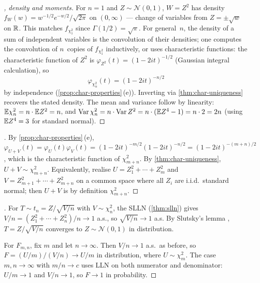 \begin{proof}[, density and moments]
For $n = 1$ and $Z \sim \mathcal{N}(0, 1)$, $W = Z^2$ has density
$f_W(w) = w^{-1/2} e^{-w/2}/\sqrt{2 \pi}$ on $(0, \infty)$ — change
of variables from $Z = \pm \sqrt w$ on $\mathbb{R}$. This matches
$f_{\chi^2_1}$ since $\Gamma(1/2) = \sqrt \pi$. For general~$n$, the
density of a sum of independent variables is the convolution of
their densities; one computes the convolution of $n$~copies of
$f_{\chi^2_1}$ inductively, or uses characteristic functions: the
characteristic function of $Z^2$ is
$\varphi_{Z^2}(t) = (1 - 2it)^{-1/2}$ (Gaussian integral
calculation), so
\[
  \varphi_{\chi^2_n}(t) = (1 - 2it)^{-n/2}
\]
by independence (\cref{prop:char-properties}\,(e)). Inverting via
\cref{thm:char-uniqueness} recovers the stated density. The mean
and variance follow by linearity:
$\mathbb{E} \chi^2_n = n \cdot \mathbb{E} Z^2 = n$, and
$\operatorname{Var} \chi^2_n = n \cdot \operatorname{Var} Z^2 = n \cdot (\mathbb{E} Z^4 - 1) = n \cdot 2 = 2n$
(using $\mathbb{E} Z^4 = 3$ for standard normal).
\end{proof}

\begin{proof}[]
By \cref{prop:char-properties}\,(e),
$\varphi_{U + V}(t) = \varphi_U(t) \varphi_V(t) = (1 - 2it)^{-m/2} (1 - 2it)^{-n/2} = (1 - 2it)^{-(m+n)/2}$,
which is the characteristic function of $\chi^2_{m+n}$. By
\cref{thm:char-uniqueness}, $U + V \sim \chi^2_{m+n}$. Equivalently,
realise $U = Z_1^2 + \cdots + Z_m^2$ and
$V = Z_{m+1}^2 + \cdots + Z_{m+n}^2$ on a common space where all
$Z_i$ are i.i.d.\ standard normal; then $U + V$ is by definition
$\chi^2_{m+n}$.
\end{proof}

\begin{proof}[]
For $T \sim t_n = Z / \sqrt{V/n}$ with $V \sim \chi^2_n$, the SLLN
(\cref{thm:slln}) gives $V/n = (Z_1^2 + \cdots + Z_n^2)/n \to 1$
a.s., so $\sqrt{V/n} \to 1$ a.s. By Slutsky's lemma
\cite[Ch.~III, \S~1]{Shiryaev1989}, $T = Z / \sqrt{V/n}$ converges
to $Z \sim \mathcal{N}(0, 1)$ in distribution.

For $F_{m, n}$, fix $m$ and let $n \to \infty$. Then
$V/n \to 1$ a.s.\ as before, so $F = (U/m) / (V/n) \to U/m$ in
distribution, where $U \sim \chi^2_m$. The case
$m, n \to \infty$ with $m/n \to c$ uses LLN on both numerator and
denominator: $U/m \to 1$ and $V/n \to 1$, so $F \to 1$ in
probability.
\end{proof}

